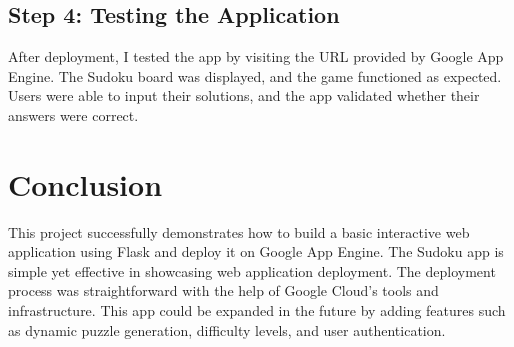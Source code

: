 \documentclass[12pt]{article}
\begin{document}
\subsection{Step 4: Testing the Application}
After deployment, I tested the app by visiting the URL provided by Google App Engine. The Sudoku board was displayed, and the game functioned as expected. Users were able to input their solutions, and the app validated whether their answers were correct.

\section{Conclusion}

This project successfully demonstrates how to build a basic interactive web application using Flask and deploy it on Google App Engine. The Sudoku app is simple yet effective in showcasing web application deployment. The deployment process was straightforward with the help of Google Cloud’s tools and infrastructure. This app could be expanded in the future by adding features such as dynamic puzzle generation, difficulty levels, and user authentication.
\end{document}
